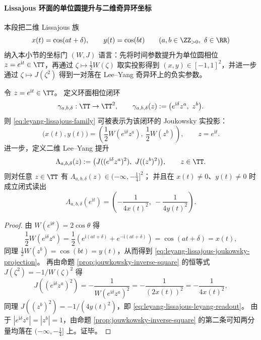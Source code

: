 

\paragraph{Lissajous 环面的单位圆提升与二维奇异环坐标}
本段把二维 Lissajous 族
\begin{equation}\label{eq:leyang-lissajous-family}
x(t)=\cos(at+\delta),\qquad y(t)=\cos(bt)
\qquad(a,b\in\ZZ_{>0},\ \delta\in\RR)
\end{equation}
纳入本小节的坐标门 \((W,J)\) 语言：先将时间参数提升为单位圆相位 \(z=e^{\mathrm{i}t}\in\TT\)，再通过 \(\zeta\mapsto \frac12W(\zeta)\) 取实投影得到 \((x,y)\in[-1,1]^2\)，并进一步通过 \(\zeta\mapsto J(\zeta^2)\) 得到一对落在 Lee--Yang 奇异环上的负实参数。

\begin{proposition}\label{prop:leyang-lissajous-unit-circle-uplift}
令 \(z=e^{\mathrm{i}t}\in\TT\)。
定义环面相位闭环
\[
\gamma_{a,b,\delta}:\TT\to\TT^2,\qquad
\gamma_{a,b,\delta}(z):=\bigl(e^{\mathrm{i}\delta}z^a,\ z^b\bigr).
\]
则 \eqref{eq:leyang-lissajous-family} 可被表示为该闭环的 Joukowsky 实投影：
\begin{equation}\label{eq:leyang-lissajous-joukowsky-projection}
\boxed{\;
\bigl(x(t),y(t)\bigr)
=\left(\frac12W(e^{\mathrm{i}\delta}z^a),\ \frac12W(z^b)\right),\qquad z=e^{\mathrm{i}t}. \;}
\end{equation}
进一步，定义二维 Lee--Yang 提升
\[
\Lambda_{a,b,\delta}(z):=\bigl(J((e^{\mathrm{i}\delta}z^a)^2),\ J((z^b)^2)\bigr),
\qquad z\in\TT.
\]
则对任意 \(z\in\TT\) 有 \(\Lambda_{a,b,\delta}(z)\in(-\infty,-\tfrac14]^2\)；
并且在 \(x(t)\neq 0\)、\(y(t)\neq 0\) 时成立闭式读出
\begin{equation}\label{eq:leyang-lissajous-leyang-readout}
\boxed{\;
\Lambda_{a,b,\delta}(e^{\mathrm{i}t})
=\left(-\frac{1}{4x(t)^2},\ -\frac{1}{4y(t)^2}\right).\;}
\end{equation}
\end{proposition}
\begin{proof}
由 \(W(e^{\mathrm{i}\theta})=2\cos\theta\) 得
\[
\frac12W(e^{\mathrm{i}\delta}z^a)
=\frac12\left(e^{\mathrm{i}(at+\delta)}+e^{-\mathrm{i}(at+\delta)}\right)
=\cos(at+\delta)=x(t),
\]
同理 \(\frac12W(z^b)=\cos(bt)=y(t)\)，从而得到 \eqref{eq:leyang-lissajous-joukowsky-projection}。
再由命题 \ref{prop:jouwkowsky-inverse-square} 的恒等式 \(J(\zeta^2)=-1/W(\zeta)^2\) 得
\[
J((e^{\mathrm{i}\delta}z^a)^2)=-\frac{1}{W(e^{\mathrm{i}\delta}z^a)^2}=-\frac{1}{(2x(t))^2}=-\frac{1}{4x(t)^2},
\]
同理 \(J((z^b)^2)=-1/(4y(t)^2)\)，即 \eqref{eq:leyang-lissajous-leyang-readout}。
由于 \(|e^{\mathrm{i}\delta}z^a|=|z^b|=1\)，由命题 \ref{prop:jouwkowsky-inverse-square} 的第二条可知两分量均落在 \((-\infty,-\tfrac14]\) 上。证毕。
\end{proof}

